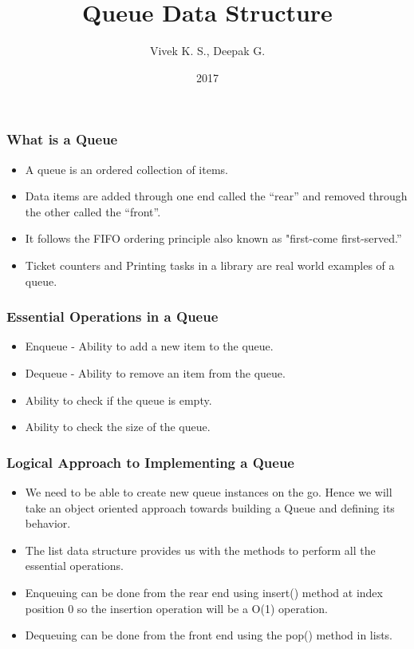\documentclass{beamer}
\title{Queue Data Structure}
\author{Vivek K. S., Deepak G.}
\institute{Information Systems Decision Sciences (ISDS)\\
MUMA College of Business\\
University of South Florida \\
Tampa, Florida}
\date{2017}
\begin{document}
 
\frame{\titlepage}
 
\begin{frame}
\frametitle{What is a Queue}
\begin{itemize}

\item A queue is an ordered collection of items.

\item Data items are added through one end called the “rear” and removed through the other called the “front”.


\item It follows the FIFO ordering principle also known as "first-come first-served.”
 

\item Ticket counters and Printing tasks in a library are real world examples of a queue.


\end{itemize}
\end{frame}


\begin{frame}
\frametitle{Essential Operations in a Queue}
\begin{itemize}

\item Enqueue - Ability to add a new item to the queue.

\item Dequeue - Ability to remove an item from the queue.

\item Ability to check if the queue is empty.

\item Ability to check the size of the queue.


\end{itemize}
\end{frame}

\begin{frame}
\frametitle{Logical Approach to Implementing a Queue}
\begin{itemize}

\item We need to be able to create new queue instances on the go. Hence we will take an object oriented approach towards building a Queue and defining its behavior.

\item The list data structure provides us with the methods to perform all the essential operations.

\item Enqueuing can be done from the rear end using insert() method at index position 0 so the insertion operation will be a O(1) operation.

\item Dequeuing can be done from the front end using the pop() method in lists.

\end{itemize}
\end{frame}
\end{document}
